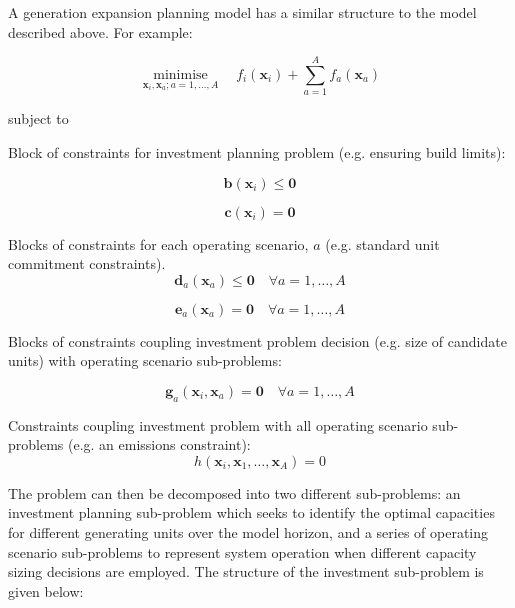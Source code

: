 \documentclass{article}
\DeclareMathOperator*{\minimise}{minimise}
\begin{document}
A generation expansion planning model has a similar structure to the model described above. For example:

\begin{equation}
\minimise\limits_{\bm{x}_{i},\bm{x}_{a}; a=1,\ldots, A} \quad f_{i}(\bm{x}_{i}) + \sum\limits_{a=1}^{A}f_{a}(\bm{x}_{a})
\end{equation}

subject to

Block of constraints for investment planning problem (e.g. ensuring build limits):

\begin{equation}
\bm{b}\left(\bm{x}_{i}\right) \leq \bm{0}
\end{equation}

\begin{equation}
\bm{c}\left(\bm{x}_{i}\right) = \bm{0}
\end{equation}

Blocks of constraints for each operating scenario, $a$ (e.g. standard unit commitment constraints).
\begin{equation}
\bm{d}_{a}\left(\bm{x}_{a}\right) \leq \bm{0} \quad \forall a = 1,\ldots,A
\end{equation}

\begin{equation}
\bm{e}_{a}\left(\bm{x}_{a}\right) = \bm{0} \quad \forall a = 1,\ldots,A
\end{equation}

Blocks of constraints coupling investment problem decision (e.g. size of candidate units) with operating scenario sub-problems:

\begin{equation}
\bm{g}_{a}\left(\bm{x}_{i}, \bm{x}_{a}\right) = \bm{0} \quad \forall a = 1,\ldots,A
\end{equation}

Constraints coupling investment problem with all operating scenario sub-problems (e.g. an emissions constraint):
\begin{equation}
h\left(\bm{x}_{i}, \bm{x}_{1}, \ldots, \bm{x}_{A}\right) = 0
\end{equation}


The problem can then be decomposed into two different sub-problems: an investment planning sub-problem which seeks to identify the optimal capacities for different generating units over the model horizon, and a series of operating scenario sub-problems to represent system operation when different capacity sizing decisions are employed. The structure of the investment sub-problem is given below:
\end{document}
